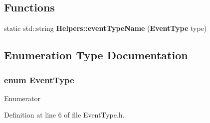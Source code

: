 \subsection*{Functions}
\begin{DoxyCompactItemize}
\item 
static std\+::string {\bf Helpers\+::event\+Type\+Name} ({\bf Event\+Type} type)
\end{DoxyCompactItemize}


\subsection{Enumeration Type Documentation}
\subsubsection[{Event\+Type}]{\setlength{\rightskip}{0pt plus 5cm}enum {\bf Event\+Type}\hspace{0.3cm}{\ttfamily [strong]}}\label{_event_type_8h_a2628ea8d12e8b2563c32f05dc7fff6fa}
\begin{Desc}
\item[Enumerator]\par
\begin{description}
\item[{\em 
client\+Arrival\label{_event_type_8h_a2628ea8d12e8b2563c32f05dc7fff6faa5082bd1bb24d7f3de37e24ba1ef3a3d0}
}]\item[{\em 
finish\+Simulation\label{_event_type_8h_a2628ea8d12e8b2563c32f05dc7fff6faa58617a4651d63b70cef423713ae32971}
}]\end{description}
\end{Desc}


Definition at line 6 of file Event\+Type.\+h.


